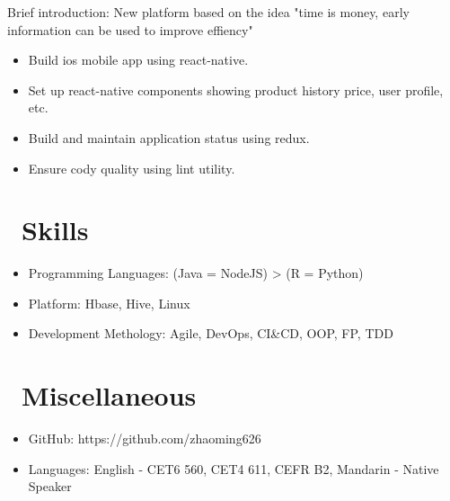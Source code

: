 \documentclass{resume}
\begin{document}
Brief introduction: New platform based on the idea "time is money, early information can be used to improve effiency" 
\begin{itemize}
  \item Build ios mobile app using react-native. 
  \item Set up react-native components showing product history price, user profile, etc.
  \item Build and maintain application status using redux.
  \item Ensure cody quality using lint utility.
\end{itemize}



\section{\faCogs\ Skills}
\begin{itemize}[parsep=0.5ex]
  \item Programming Languages: (Java = NodeJS) > (R = Python) 
  \item Platform: Hbase, Hive, Linux
  \item Development Methology: Agile, DevOps, CI\&CD, OOP, FP, TDD
\end{itemize}

\section{\faInfo\ Miscellaneous}
\begin{itemize}[parsep=0.5ex]
  \item GitHub: https://github.com/zhaoming626
  \item Languages: English - CET6 560, CET4 611, CEFR B2, Mandarin - Native Speaker
\end{itemize}

%
%
\end{document}
